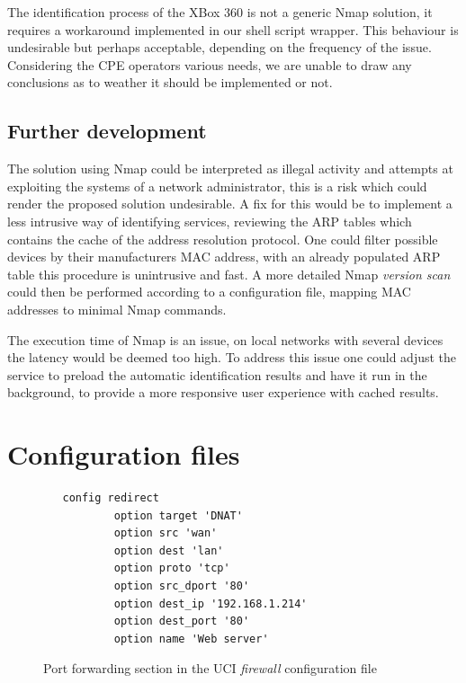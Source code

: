 \documentclass[a4paper,11pt]{kth-bcs}
\begin{document}
The identification process of the XBox 360 is not a generic Nmap solution, it requires a workaround implemented in our shell script wrapper.
This behaviour is undesirable but perhaps acceptable, depending on the frequency of the issue.
Considering the CPE operators various needs, we are unable to draw any conclusions as to weather it should be implemented or not.

\newpage
\section{Further development}
The solution using Nmap could be interpreted as illegal activity and attempts at exploiting the systems of a network administrator, this is a risk which could render the proposed solution undesirable.
A fix for this would be to implement a less intrusive way of identifying services, reviewing the ARP tables which contains the cache of the address resolution protocol.
One could filter possible devices by their manufacturers MAC address, with an already populated ARP table this procedure is unintrusive and fast.
A more detailed Nmap \emph{version scan} could then be performed according to a configuration file, mapping MAC addresses to minimal Nmap commands.

The execution time of Nmap is an issue, on local networks with several devices the latency would be deemed too high.
To address this issue one could adjust the service to preload the automatic identification results and have it run in the background, to provide a more responsive user experience with cached results.

\newpage
\newpage
\appendix
\addappheadtotoc
\chapter{Configuration files}\label{appA}

   \begin{figure}[ht]
      \centering
      \begin{verbatim}
   config redirect               
           option target 'DNAT' 
           option src 'wan'
           option dest 'lan'
           option proto 'tcp'
           option src_dport '80'
           option dest_ip '192.168.1.214'
           option dest_port '80' 
           option name 'Web server'
      \end{verbatim}
      \caption{
         \small{
Port forwarding section in the UCI \emph{firewall} configuration file
         }
      }
      \label{fig:redirect_conf}
   \end{figure}
\end{document}
